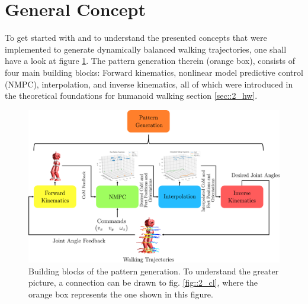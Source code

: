 \FloatBarrier
\section{General Concept}
\label{sec::21_hw}
To get started with and to understand the presented concepts that were implemented to generate dynamically balanced walking trajectories, one shall have a look at figure \ref{fig::21_pg}. The pattern generation therein (orange box), consists of four main building blocks: Forward kinematics, nonlinear model predictive control (NMPC), interpolation, and inverse kinematics, all of which were introduced in the theoretical foundations for humanoid walking section \ref{sec::2_hw}.
\begin{figure}[h!]
	\centering
	\includegraphics[scale=.5]{chapters/06_implementation_of_the_walking_pattern_generator/img/pattern_generation.png}
	\caption{Building blocks of the pattern generation. To understand the greater picture, a connection can be drawn to fig. \ref{fig::2_cl}, where the orange box represents the one shown in this figure.}
	\label{fig::21_pg}
\end{figure}
